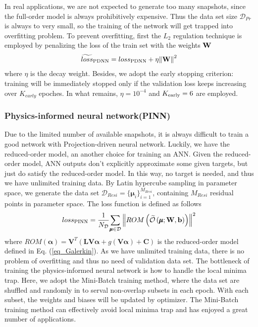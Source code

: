 \documentclass[preprint, 10pt]{elsarticle}
\begin{document}
In real applications, we are not expected to generate too many snapshots, since the full-order model is always prohibitively expensive. Thus the data set size $\mathcal{D}_{Pr}$ is always to very small, so the training of the network will get trapped into overfitting problem. To prevent overfitting, first the $L_2$ regulation technique is employed by penalizing the loss of the train set with the weights $\bf{W}$
\begin{equation}
\widetilde{loss}_{\rm{PDNN}}
 = loss_{\rm{PDNN}}
  + \eta {\left\| { \mathbf{W} } \right\|}^2
\end{equation}
where $\eta$ is the decay weight.
Besides, we adopt the early stopping criterion: training will be immediately stopped only if the validation loss keeps increasing over $K_{early}$ epoches. In what remains, $\eta=10^{-4}$ and $K_{\rm{early}}=6$ are employed.

\subsubsection{Physics-informed neural network(PINN)}
Due to the limited number of available snapshots, it is always difficult to train a good network with Projection-driven neural network. Luckily, we have the reduced-order model, an another choice for training an ANN. Given the reduced-order model, ANN outputs don't explicitly approximate some given targets, but just do satisfy the reduced-order model. In this way, no target is needed, and thus we have unlimited training data. By Latin hypercube sampling in parameter space, we generate the data set $\mathcal{D}_{Resi}=\{ \pmb{\mu}_i\}_{i=1}^{M_{Resi}}$, containing $M_{Resi}$ residual points in parameter space. The loss function is defined as follows
\begin{equation}
{loss}_{\rm{PINN}} = \frac{1}{N_{\cal D}}
{{\sum\limits_{\pmb\mu  \in {\cal D}}
{ \left\|
ROM \left(\widetilde {\cal O}\left( {\pmb\mu ;{\bf{W}},{\bf{b}}} \right) \right)
\right \|^2}
}}
\end{equation}
where $ROM(\pmb{\alpha})=\mathbf{V}^T
\left(
 \mathbf{L} \mathbf{V} \pmb{\alpha}
+ g         \left( \mathbf{V} \pmb{\alpha} \right)
+\mathbf{C}
\right)$
is the reduced-order model defined in Eq. (\ref{eq_Galerkin}).
As we have unlimited training data, there is no problem of overfitting and thus no need of validation data set.  The bottleneck of training the physics-informed neural network is how to handle the local minima trap. Here, we adopt the Mini-Batch training method, where the data set are shuffled and randomly in to serval non-overlap subsets in each epoch. With each subset, the weights and biases will be updated by optimizer. The Mini-Batch training method can effectively avoid local minima trap and has enjoyed a great number of applications.
\end{document}
